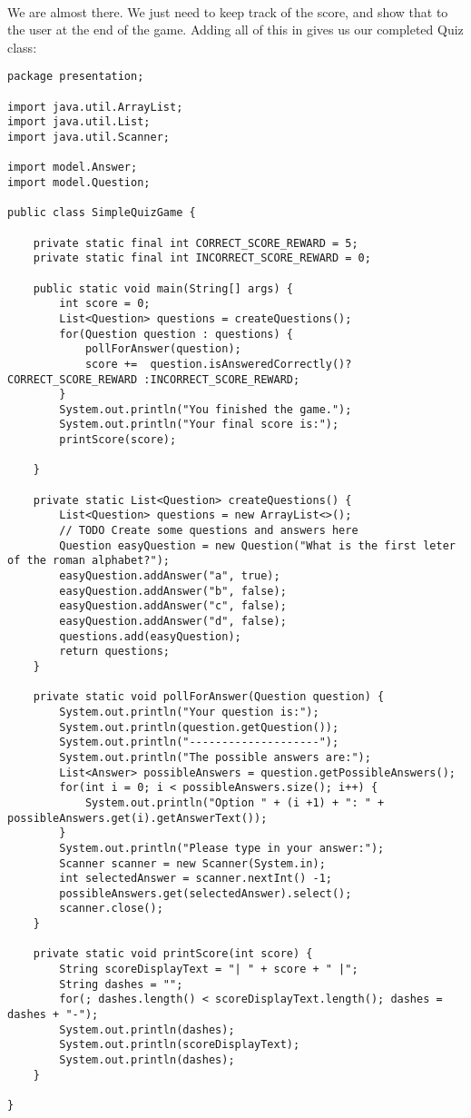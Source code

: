 \documentclass[11pt,fleqn]{book} %
\begin{document}
\paragraph{}We are almost there. We just need to keep track of the score, and show that to the user at the end of the game. Adding all of this in gives us our completed Quiz class:
\begin{lstlisting}
package presentation;

import java.util.ArrayList;
import java.util.List;
import java.util.Scanner;

import model.Answer;
import model.Question;

public class SimpleQuizGame {

	private static final int CORRECT_SCORE_REWARD = 5;
	private static final int INCORRECT_SCORE_REWARD = 0;
	
	public static void main(String[] args) {
		int score = 0;
		List<Question> questions = createQuestions();
		for(Question question : questions) {
			pollForAnswer(question);
			score +=  question.isAnsweredCorrectly()? CORRECT_SCORE_REWARD :INCORRECT_SCORE_REWARD;
		}
		System.out.println("You finished the game.");
		System.out.println("Your final score is:");
		printScore(score);
		
	}

	private static List<Question> createQuestions() {
		List<Question> questions = new ArrayList<>();
		// TODO Create some questions and answers here
		Question easyQuestion = new Question("What is the first leter of the roman alphabet?");
		easyQuestion.addAnswer("a", true);
		easyQuestion.addAnswer("b", false);
		easyQuestion.addAnswer("c", false);
		easyQuestion.addAnswer("d", false);
		questions.add(easyQuestion);
		return questions;
	}
	
	private static void pollForAnswer(Question question) {
		System.out.println("Your question is:");
		System.out.println(question.getQuestion());
		System.out.println("--------------------");
		System.out.println("The possible answers are:");
		List<Answer> possibleAnswers = question.getPossibleAnswers();
		for(int i = 0; i < possibleAnswers.size(); i++) {
			System.out.println("Option " + (i +1) + ": " + possibleAnswers.get(i).getAnswerText());
		}
		System.out.println("Please type in your answer:");
		Scanner scanner = new Scanner(System.in);
		int selectedAnswer = scanner.nextInt() -1;
		possibleAnswers.get(selectedAnswer).select();
		scanner.close();
	}
	
	private static void printScore(int score) {
		String scoreDisplayText = "| " + score + " |";
		String dashes = "";
		for(; dashes.length() < scoreDisplayText.length(); dashes = dashes + "-");
		System.out.println(dashes);
		System.out.println(scoreDisplayText);
		System.out.println(dashes);
	}

}
\end{lstlisting}
\end{document}
